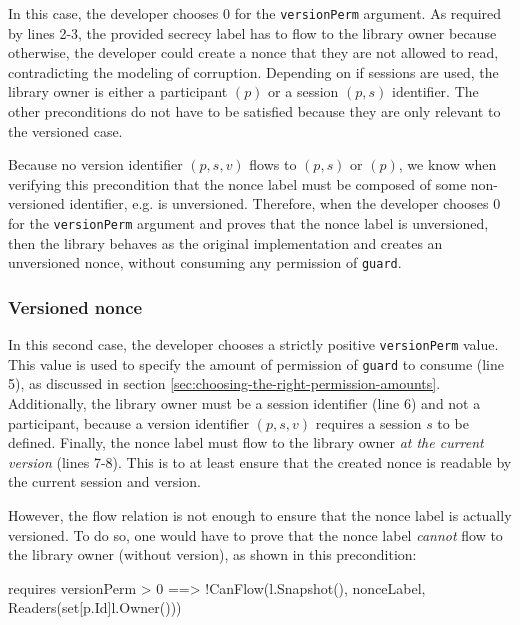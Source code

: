 In this case, the developer chooses $0$ for the \texttt{versionPerm} argument.
As required by lines 2-3, the provided secrecy label has to flow to the library owner because otherwise, the developer could create a nonce that they are not allowed to read, contradicting the modeling of corruption.
Depending on if sessions are used, the library owner is either a participant $(p)$ or a session $(p,s)$ identifier.
The other preconditions do not have to be satisfied because they are only relevant to the versioned case.

Because no version identifier $(p,s,v)$ flows to $(p,s)$ or $(p)$, we know when verifying this precondition that the nonce label must be composed of some non-versioned identifier, e.g. is unversioned.
Therefore, when the developer chooses $0$ for the \texttt{versionPerm} argument and proves that the nonce label is unversioned, then the library behaves as the original implementation and creates an unversioned nonce, without consuming any permission of \texttt{guard}.

\subsubsection{Versioned nonce}
\label{sec:versioned-nonce}

In this second case, the developer chooses a strictly positive \texttt{versionPerm} value.
This value is used to specify the amount of permission of \texttt{guard} to consume (line 5), as discussed in section \ref{sec:choosing-the-right-permission-amounts}.
Additionally, the library owner must be a session identifier (line 6) and not a participant, because a version identifier $(p,s,v)$ requires a session $s$ to be defined.
Finally, the nonce label must flow to the library owner \emph{at the current version} (lines 7-8).
This is to at least ensure that the created nonce is readable by the current session and version.

However, the flow relation is not enough to ensure that the nonce label is actually versioned. To do so, one would have to prove that the nonce label \emph{cannot} flow to the library owner (without version), as shown in this precondition:

\begin{gobra}
requires versionPerm > 0 ==>
    !CanFlow(l.Snapshot(), nonceLabel, Readers(set[p.Id]{l.Owner()}))
\end{gobra}


